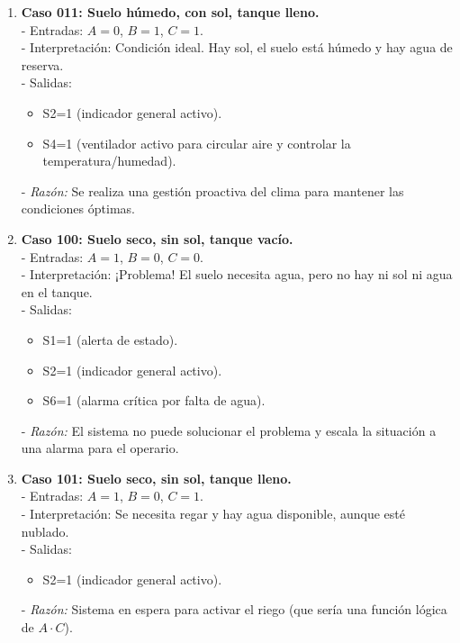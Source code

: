 \begin{enumerate}
    \item \textbf{Caso 011: Suelo húmedo, con sol, tanque lleno.}\\
    - Entradas: $A=0$, $B=1$, $C=1$.\\
    - Interpretación: Condición ideal. Hay sol, el suelo está húmedo y hay agua de reserva.\\
    - Salidas:
        \begin{itemize}
            \item S2=1 (indicador general activo).
            \item S4=1 (ventilador activo para circular aire y controlar la temperatura/humedad).
        \end{itemize}
    - \emph{Razón:} Se realiza una gestión proactiva del clima para mantener las condiciones óptimas.

    \item \textbf{Caso 100: Suelo seco, sin sol, tanque vacío.}\\
    - Entradas: $A=1$, $B=0$, $C=0$.\\
    - Interpretación: ¡Problema! El suelo necesita agua, pero no hay ni sol ni agua en el tanque.\\
    - Salidas:
        \begin{itemize}
            \item S1=1 (alerta de estado).
            \item S2=1 (indicador general activo).
            \item S6=1 (alarma crítica por falta de agua).
        \end{itemize}
    - \emph{Razón:} El sistema no puede solucionar el problema y escala la situación a una alarma para el operario.

    \item \textbf{Caso 101: Suelo seco, sin sol, tanque lleno.}\\
    - Entradas: $A=1$, $B=0$, $C=1$.\\
    - Interpretación: Se necesita regar y hay agua disponible, aunque esté nublado.\\
    - Salidas:
        \begin{itemize}
            \item S2=1 (indicador general activo).
        \end{itemize}
    - \emph{Razón:} Sistema en espera para activar el riego (que sería una función lógica de $A \cdot C$).


\end{enumerate}
